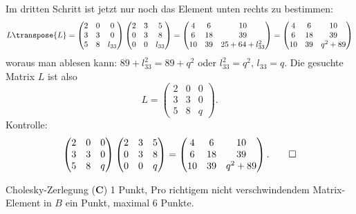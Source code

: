 \begin{loesung}
Im dritten Schritt ist jetzt nur noch das Element unten rechts zu bestimmen:
\[
L\transpose{L}=
\begin{pmatrix}
2&0&     0\\
3&3&     0\\
5&8&l_{33}
\end{pmatrix}
\begin{pmatrix}
2&3&     5\\
0&3&     8\\
0&0&l_{33}
\end{pmatrix}
=
\begin{pmatrix}
 4& 6& 10\\
 6&18& 39\\
10&39& 25+64+l_{33}^2
\end{pmatrix}
=
\begin{pmatrix}
 4& 6&10\\
 6&18&39\\
10&39& q^2 + 89
\end{pmatrix}
\]
woraus man ablesen kann: $89+l_{33}^2=89+q^2$ oder $l_{33}^2=q^2$, $l_{33}=q$.
Die gesuchte Matrix $L$ ist also
\[
L=
\begin{pmatrix}
2&0&0\\
3&3&0\\
5&8&q
\end{pmatrix}.
\]
Kontrolle:
\[
\begin{pmatrix}
2&0&0\\
3&3&0\\
5&8&q
\end{pmatrix}
\begin{pmatrix}
2&3&5\\
0&3&8\\
0&0&q
\end{pmatrix}
=
\begin{pmatrix}
 4& 6&10\\
 6&18&39\\
10&39&q^2 + 89
\end{pmatrix}.
\qedhere
\]
\end{loesung}

\begin{bewertung}
Cholesky-Zerlegung ({\bf C}) 1 Punkt,
Pro richtigem nicht verschwindendem Matrix-Element in $B$ ein Punkt,
maximal 6 Punkte.
\end{bewertung}

